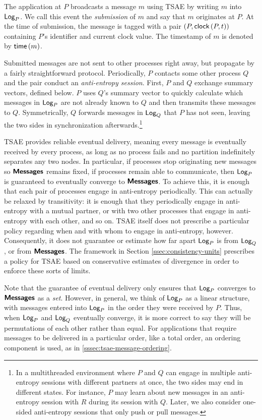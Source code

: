\documentclass[]             %
{NASA}                       %
\theoremstyle{definition}
\begin{document}
The application at $P$ broadcasts a message $m$ using TSAE by writing
$m$ into $\textsf{Log}_{P}$. We call this event the \emph{submission} of $m$ and
say that $m$ originates at $P$. At the time of submission, the message
is tagged with a pair $(P, \textsf{clock}\left(P,t\right))$ containing $P$'s identifier
and current clock value. The timestamp of $m$ is denoted by
$\mathsf{time}\left(m\right)$.

Submitted messages are not sent to other processes right away, but
propagate by a fairly straightforward protocol. Periodically, $P$
contacts some other process $Q$ and the pair conduct an
\emph{anti-entropy session}. First, $P$ and $Q$ exchange summary
vectors, defined below. $P$ uses $Q$'s summary vector to quickly
calculate which messages in $\textsf{Log}_{P}$ are not already known to $Q$ and
then transmits these messages to $Q$. Symmetrically, $Q$ forwards
messages in $\textsf{Log}_{Q}$ that $P$ has not seen, leaving the two sides in
synchronization afterwards.\footnote{In a multithreaded environment
  where $P$ and $Q$ can engage in multiple anti-entropy sessions with
  different partners at once, the two sides may end in different
  states. For instance, $P$ may learn about new messages in an
  anti-entropy session with $R$ during its session with $Q$. Later, we
  also consider one-sided anti-entropy sessions that only push or pull
  messages. }

TSAE provides reliable eventual delivery, meaning every message is
eventually received by every process, as long as no process fails and
no partition indefinitely separates any two nodes. In particular, if
processes stop originating new messages so $\textbf{\textsf{Messages}}$ remains fixed, if
processes remain able to communicate, then $\textsf{Log}_{P}$ is guaranteed to
eventually converge to $\textbf{\textsf{Messages}}$. To achieve this, it is enough that each
pair of processes engage in anti-entropy periodically. This can
actually be relaxed by transitivity: it is enough that they
periodically engage in anti-entropy with a mutual partner, or with two
other processes that engage in anti-entropy with each other, and so
on. TSAE itself does not prescribe a particular policy regarding when
and with whom to engage in anti-entropy, however. Consequently, it
does not guarantee or estimate how far apart $\textsf{Log}_{P}$ is from
$\textsf{Log}_{Q}$, or from $\textbf{\textsf{Messages}}$. The framework in Section
\ref{ssec:consistency-units} prescribes a policy for TSAE based on
conservative estimates of divergence in order to enforce these sorts
of limits.

Note that the guarantee of eventual delivery only ensures that
$\textsf{Log}_{P}$ converges to $\textbf{\textsf{Messages}}$ as a \emph{set}. However, in general, we
think of $\textsf{Log}_{P}$ as a linear structure, with messages entered into
$\textsf{Log}_{P}$ in the order they were received by $P$. Thus, when $\textsf{Log}_{P}$
and $\textsf{Log}_{Q}$ eventually converge, it is more correct to say they will
be permutations of each other rather than equal. For applications that
require messages to be delivered in a particular order, like a total
order, an ordering component is used, as in
\ref{sssec:tsae-message-ordering}.
\end{document}
